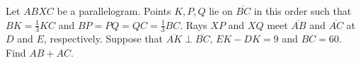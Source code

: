 Let $ABXC$ be a parallelogram.  Points $K,P,Q$ lie on $\overline{BC}$ in this order such that $BK = \frac{1}{3} KC$ and $BP = PQ = QC = \frac{1}{3} BC$.  Rays $XP$ and $XQ$ meet $\overline{AB}$ and $\overline{AC}$ at $D$ and $E$, respectively.  Suppose that $\overline{AK} \perp \overline{BC}$, $EK-DK=9$ and $BC=60$.  Find $AB+AC$.
